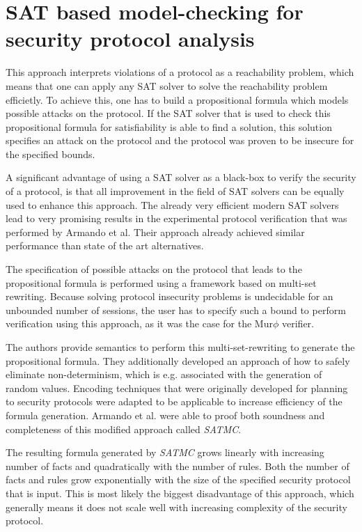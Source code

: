 \documentclass[a4paper,UKenglish]{lipics-v2018}
\def\murphi{Mur$\phi$ }
\begin{document}
\section{SAT based model-checking for security protocol analysis}

This approach interprets violations of a protocol as a reachability problem, which means that one can apply any SAT solver to solve the reachability problem efficietly. To achieve this, one has to build a propositional formula which models possible attacks on the protocol. If the SAT solver that is used to check this propositional formula for satisfiability is able to find a solution, this solution specifies an attack on the protocol and the protocol was proven to be insecure for the specified bounds.\cite{sat}

A significant advantage of using a SAT solver as a black-box to verify the security of a protocol, is that all improvement in the field of SAT solvers can be equally used to enhance this approach. The already very efficient modern SAT solvers lead to very promising results in the experimental protocol verification that was performed by Armando et al. Their approach already achieved similar performance than state of the art alternatives.
\cite{sat}

The specification of possible attacks on the protocol that leads to the propositional formula is performed using a framework based on multi-set rewriting. Because solving protocol insecurity problems is undecidable for an unbounded number of sessions, the user has to specify such a bound to perform verification using this approach, as it was the case for the \murphi verifier.
\cite{sat}

The authors provide semantics to perform this multi-set-rewriting to generate the propositional formula. They additionally developed an approach of how to safely eliminate non-determinism, which is e.g. associated with the generation of random values.
Encoding techniques that were originally developed for planning to security protocols were adapted to be applicable to increase efficiency of the formula generation. Armando et al. were able to proof both soundness and completeness of this modified approach called \textit{SATMC}.
\cite{sat}

The resulting formula generated by \textit{SATMC} grows linearly with increasing number of facts and quadratically with the number of rules. Both the number of facts and rules grow exponentially with the size of the specified security protocol that is input. This is most likely the biggest disadvantage of this approach, which generally means it does not scale well with increasing complexity of the security protocol.
\cite{sat}
\end{document}
